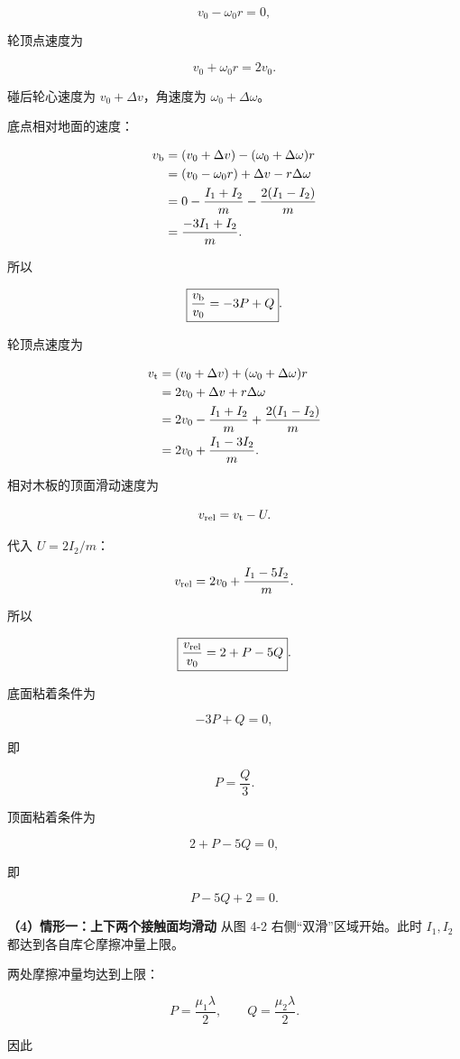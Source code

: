 \documentclass[12pt,a4paper,UTF8]{ctexart}
\begin{document}
\[v_0-\omega_0r=0,\]

轮顶点速度为

\[v_0+\omega_0r=2v_0.\]

碰后轮心速度为 \(v_0+\Delta v\)，角速度为 \(\omega_0+\Delta\omega\)。

底点相对地面的速度：

\[\begin{aligned}
v_{\rm b}
&=(v_0+\Delta v)-(\omega_0+\Delta\omega)r\\
&=(v_0-\omega_0r)+\Delta v-r\Delta\omega\\
&=0-\frac{I_1+I_2}{m}-\frac{2(I_1-I_2)}m\\
&=\frac{-3I_1+I_2}{m}.
\end{aligned}\]

所以

\[\boxed{\frac{v_{\rm b}}{v_0}=-3P+Q}.\]

轮顶点速度为

\[\begin{aligned}
v_{\rm t}
&=(v_0+\Delta v)+(\omega_0+\Delta\omega)r\\
&=2v_0+\Delta v+r\Delta\omega\\
&=2v_0-\frac{I_1+I_2}{m}+\frac{2(I_1-I_2)}m\\
&=2v_0+\frac{I_1-3I_2}{m}.
\end{aligned}\]

相对木板的顶面滑动速度为

\[v_{\rm rel}=v_{\rm t}-U.\]

代入 \(U=2I_2/m\)：

\[v_{\rm rel}=2v_0+\frac{I_1-5I_2}{m}.\]

所以

\[\boxed{\frac{v_{\rm rel}}{v_0}=2+P-5Q}.\]

底面粘着条件为

\[-3P+Q=0,\]

即

\[\boxed{P=\frac Q3}.\]

顶面粘着条件为

\[2+P-5Q=0,\]

即

\[\boxed{P-5Q+2=0}.\]

\textbf{（4）情形一：上下两个接触面均滑动} 从图 4-2
右侧``双滑''区域开始。此时 \(I_1,I_2\) 都达到各自库仑摩擦冲量上限。

两处摩擦冲量均达到上限：

\[P=\frac{\mu_1\lambda}{2},
\qquad
Q=\frac{\mu_2\lambda}{2}.\]

因此
\end{document}
